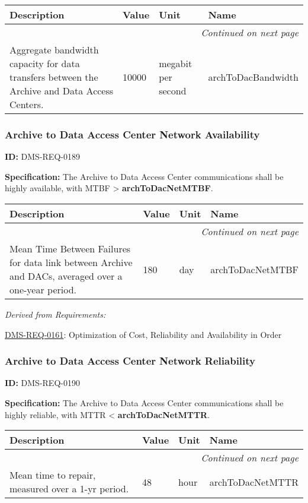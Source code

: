 \documentclass[SE,toc,lsstdraft]{lsstdoc}
\makeatletter
\newcommand{\paramname}[1]{\hspace{0pt}#1}
\newcommand{\unitname}[1]{\hspace{0pt}#1}
\newenvironment{parameters}[0]{%
\setlength\LTleft{0pt}
\setlength\LTright{\fill}
\begin{small}
\begin{longtable}[]{|p{0.5\textwidth}|l|p{0.6in}|p{1.74in}@{}|}

\hline \textbf{Description} & \textbf{Value} & \textbf{Unit} & \textbf{Name} \\ \hline
\endhead

\hline \multicolumn{4}{r}{\emph{Continued on next page}} \\
\endfoot

\hline\hline
\endlastfoot
}{%
\hline
\end{longtable}
\end{small}
}
\makeatother
\begin{document}
\begin{parameters}
Aggregate bandwidth capacity for data transfers between the Archive and Data Access Centers.
&
10000
&
\unitname{%
megabit per second
}
&
\paramname{%
archToDacBandwidth
} \\\hline
\end{parameters}




\subsubsection{Archive to Data Access Center Network Availability}

\label{DMS-REQ-0189}
\textbf{ID:} DMS-REQ-0189

\textbf{Specification:} The Archive to Data Access Center communications shall be highly available, with MTBF > \textbf{archToDacNetMTBF}.





\begin{parameters}
Mean Time Between Failures for data link between Archive and DACs, averaged over a one-year period.
&
180
&
\unitname{%
day
}
&
\paramname{%
archToDacNetMTBF
} \\\hline
\end{parameters}




\emph{Derived from Requirements:}

\hyperref[DMS-REQ-0161]{DMS-REQ-0161}:
Optimization of Cost, Reliability and Availability in Order \newline


\subsubsection{Archive to Data Access Center Network Reliability}

\label{DMS-REQ-0190}
\textbf{ID:} DMS-REQ-0190

\textbf{Specification:} The Archive to Data Access Center communications shall be highly reliable, with MTTR < \textbf{archToDacNetMTTR}.





\begin{parameters}
Mean time to repair, measured over a 1-yr period.
&
48
&
\unitname{%
hour
}
&
\paramname{%
archToDacNetMTTR
} \\\hline
\end{parameters}
\end{document}
